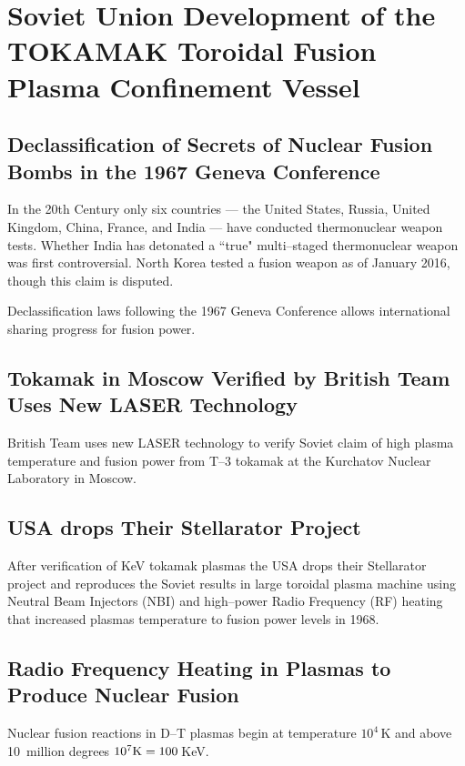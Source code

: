 \documentclass[a4paper,openany,12pt]{book}
\begin{document}
%
\chapter[Soviet Union Development of the TOKAMAK]{Soviet Union Development of the TOKAMAK Toroidal Fusion Plasma Confinement Vessel}

\section{Declassification of Secrets of Nuclear Fusion Bombs in the 1967 Geneva Conference}

In the 20th Century only six countries --- the United States, Russia, United Kingdom, China, France, and India --- have conducted thermonuclear weapon tests. Whether India has detonated a ``true" multi--staged thermonuclear weapon was first controversial. North Korea tested a fusion weapon as of January 2016, though this claim is disputed.

Declassification laws following the 1967 Geneva Conference allows international sharing progress for fusion power.

\section{Tokamak in Moscow Verified by British Team Uses New LASER Technology}

British Team uses new LASER technology to verify Soviet claim of high plasma temperature and fusion power from T--3 tokamak at the Kurchatov Nuclear Laboratory in Moscow.

\section{USA drops Their Stellarator Project}

After verification of KeV tokamak plasmas the USA drops their Stellarator project and reproduces the Soviet results in large toroidal plasma machine using Neutral Beam Injectors (NBI) and high--power Radio Frequency (RF) heating that increased plasmas temperature to fusion power levels in 1968.

\section[Radio Frequency Heating in Plasmas]{Radio Frequency Heating in Plasmas to Produce Nuclear Fusion}

Nuclear fusion reactions in D--T plasmas begin at temperature $10^4\,$K and above 10~million degrees $10^7\rm K=100\,$KeV.
\end{document}
